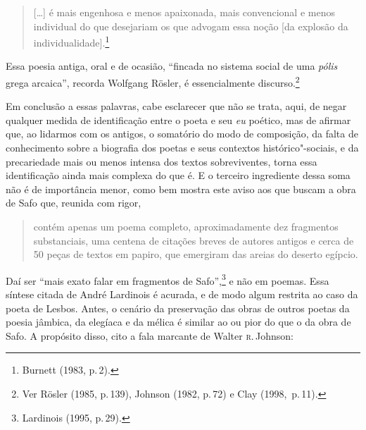 \begin{quote}
{[}\ldots{}{]} é mais engenhosa e menos apaixonada,
mais convencional e menos individual do que desejariam os que advogam essa noção {[}da explosão da individualidade{]}.\footnote{ Burnett (1983, p.\,2).} 
\end{quote}

Essa poesia antiga, oral e de
ocasião, “fincada no sistema social de uma \textit{pólis} grega arcaica”,
recorda Wolfgang Rösler, é essencialmente discurso.\footnote{ Ver
Rösler (1985, p.\,139), Johnson (1982, p.\,72) e Clay \mbox{(1998, p.\,11)}.}

Em conclusão a essas palavras, cabe esclarecer que não se trata, aqui, de negar
qualquer medida de identificação entre o poeta e seu \textit{eu} poético, mas de
afirmar que, ao lidarmos com os antigos, o somatório do modo de composição, da
falta de conhecimento sobre a biografia dos poetas e seus contextos
histórico"-sociais, e da precariedade mais ou menos intensa dos textos
sobreviventes, torna essa identificação ainda mais complexa do que é.
E o terceiro ingrediente dessa soma não é de importância menor, como
bem mostra este aviso aos que buscam a obra de Safo que, reunida com rigor,

\begin{quote}
contém apenas um poema completo, aproximadamente dez fragmentos substanciais,
uma centena de citações breves de autores antigos e cerca de 50 peças de textos
em papiro, que emergiram das areias do deserto egípcio.
\end{quote}

Daí ser “mais exato
falar em fragmentos de Safo”,\footnote{ Lardinois (1995, p.\,29).} e não em
poemas. Essa síntese citada de André Lardinois é acurada, e de modo algum restrita ao
caso da poeta de Lesbos.
Antes, o cenário da preservação das obras de outros poetas da poesia jâmbica, da elegíaca e da mélica é similar ao ou pior do que
o da obra de Safo. A propósito disso, cito a fala marcante de Walter \textsc{r}.\,Johnson:

